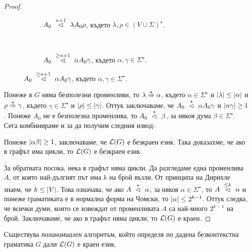\begin{proof}
\begin{figure}[H]
\begin{subfigure}[t]{0.5\textwidth}
    \caption{$A_0 \yield{n+1} \lambda A_0 \rho$, където $\lambda, \rho \in (V\cup\Sigma)^\star$.}
    \end{subfigure}
    ~ 
    \begin{subfigure}[t]{0.5\textwidth}
      \centering
      \caption{$A_0 \yield{\geq n+1}\alpha A_0\gamma$, където $\alpha,\gamma \in \Sigma^\star$.}
    \end{subfigure}
  \end{figure}

  Понеже в $G$ няма безполезни променливи, то $\lambda \derive{\star} \alpha$, където $\alpha \in \Sigma^\star$ и $\abs{\lambda} \leq \abs{\alpha}$ и $\rho \derive{\star} \gamma$,
  където $\gamma \in \Sigma^\star$ и $\abs{\rho} \leq \abs{\gamma}$.
  Оттук заключаваме, че $A_0 \yield{\star} \alpha A_0 \gamma$ и $\abs{\alpha\gamma} \geq 1$.
  Понеже $A_0$ не е безполезна променлива, то $A_0 \yield{\star} \beta$, за някоя дума $\beta \in \Sigma^\star$.
  Сега комбинираме  и  за да получим следния извод:
  \begin{prooftree}
  \end{prooftree}
  Понеже $\abs{\alpha\beta} \geq 1$, заключаваме, че $\L(G)$ е безкраен език.
  Така доказахме, че ако в графът има цикли, то $\L(G)$ е безкраен език.
  
  За обратната посока, нека в графът няма цикли.
  Да разгледаме една променлива $A$, от която най-дългият път има $k$ на брой възли.
  От принципа на Дирихле знаем, че $k \leq \abs{V}$.
  Това означава, че ако $A \yield{\star} \alpha$, за някоя $\alpha \in \Sigma^\star$,
  то $A \yield{\leq k} \alpha$ и понеже граматиката е в нормална форма на Чомски,
  то $\abs{\alpha} \leq 2^{k-1}$.
  Оттук следва, че всички думи, които се извеждат от променливата $A$ са най-много $2^{k-1}$ на брой.
  Заключаваме, че ако в графът няма цикли, то $\L(G)$ е краен.
\end{proof}

\begin{theorem}
  Съществува \emph{полиномиален} алгоритъм, който определя по дадена безконтекстна граматика $G$ дали $\L(G)$ е краен език.
\end{theorem}

